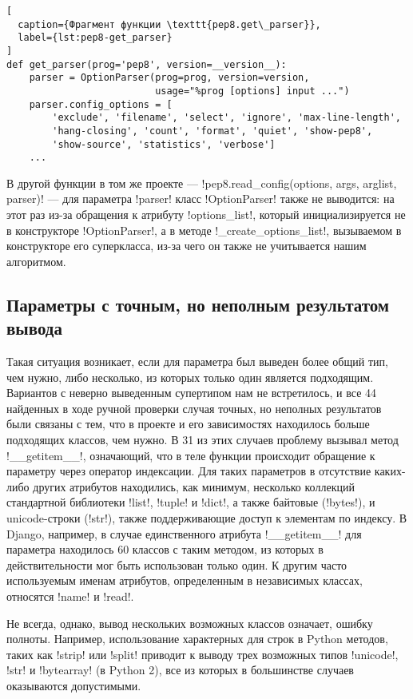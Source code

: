 \begin{lstlisting}[
  caption={Фрагмент функции \texttt{pep8.get\_parser}}, 
  label={lst:pep8-get_parser} 
]
def get_parser(prog='pep8', version=__version__):
    parser = OptionParser(prog=prog, version=version,
                          usage="%prog [options] input ...")
    parser.config_options = [
        'exclude', 'filename', 'select', 'ignore', 'max-line-length',
        'hang-closing', 'count', 'format', 'quiet', 'show-pep8',
        'show-source', 'statistics', 'verbose']
    ...
\end{lstlisting}

В другой функции в том же проекте --- 
!pep8.read_config(options, args, arglist, parser)!
--- для параметра !parser!
класс !OptionParser! также не выводится: на этот раз из-за обращения к атрибуту
!options_list!, который инициализируется не в конструкторе !OptionParser!, а в
методе !_create_options_list!, вызываемом в конструкторе его суперкласса,
из-за чего он также не учитывается нашим алгоритмом.



\subsection{Параметры с точным, но неполным результатом вывода}
\label{sub:sound-incomplete}

Такая ситуация возникает, если для параметра был выведен более общий тип, чем
нужно, либо несколько, из которых только один является подходящим. Вариантов с
неверно выведенным супертипом нам не встретилось, и все 44 найденных в ходе
ручной проверки случая точных, но неполных результатов были связаны с тем, что в
проекте и его зависимостях находилось больше подходящих классов, чем нужно. В 31
из этих случаев проблему вызывал метод !__getitem__!, означающий, что в теле
функции происходит обращение к параметру через оператор индексации. Для таких
параметров в отсутствие каких-либо других атрибутов находились, как
минимум, несколько коллекций стандартной библиотеки !list!, !tuple! и !dict!, а
также байтовые (!bytes!), и unicode-строки (!str!), также поддерживающие доступ
к элементам по индексу. В Django, например, в случае единственного атрибута
!__getitem__! для параметра находилось 60 классов с таким методом, из которых в
действительности мог быть использован только один. К другим часто используемым
именам атрибутов, определенным в независимых классах, относятся !name! и !read!. 

Не всегда, однако, вывод нескольких возможных классов означает, ошибку полноты.
Например, использование характерных для строк в Python методов, таких как
!strip! или !split!  приводит к выводу трех возможных типов !unicode!, !str! и
!bytearray! (в Python 2), все из которых в большинстве случаев оказываются
допустимыми.

